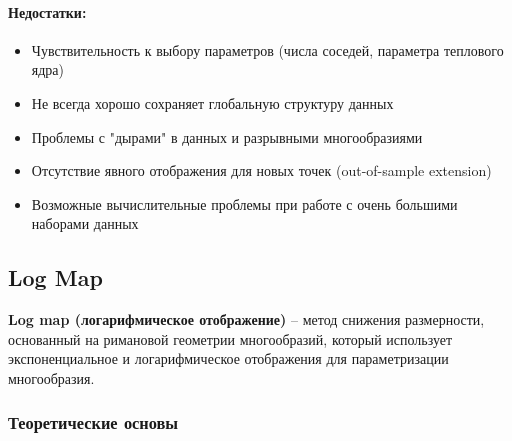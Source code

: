 \documentclass[a4paper,12pt]{article}
\begin{document}
\paragraph{Недостатки:}
\begin{itemize}
    \item Чувствительность к выбору параметров (числа соседей, параметра теплового ядра)
    \item Не всегда хорошо сохраняет глобальную структуру данных
    \item Проблемы с "дырами" в данных и разрывными многообразиями
    \item Отсутствие явного отображения для новых точек (out-of-sample extension)
    \item Возможные вычислительные проблемы при работе с очень большими наборами данных
\end{itemize}

\subsection{Log Map}

\textbf{Log map (логарифмическое отображение)} -- метод снижения размерности, основанный на римановой геометрии многообразий, который использует экспоненциальное и логарифмическое отображения для параметризации многообразия.

\subsubsection{Теоретические основы}
\end{document}
